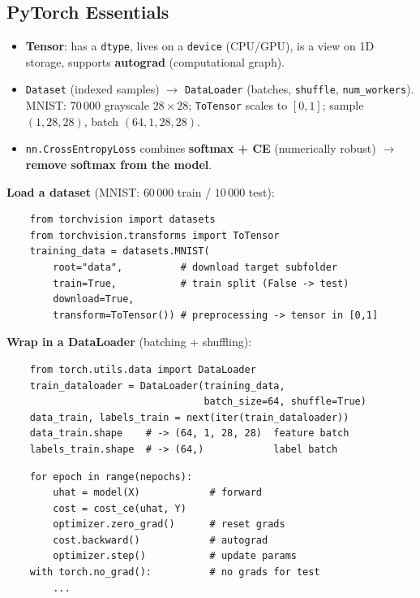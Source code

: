 \documentclass[10pt,a4paper]{article}
\begin{document}
	\subsection{PyTorch Essentials}

	\begin{itemize}[leftmargin=*]
		\item \textbf{Tensor}: has a \texttt{dtype}, lives on a \texttt{device} (CPU/GPU), is a view on 1D storage, supports \textbf{autograd} (computational graph).
		\item \texttt{Dataset} (indexed samples) $\rightarrow$ \texttt{DataLoader} (batches, \texttt{shuffle}, \texttt{num\_workers}). MNIST: $70\,000$ grayscale $28{\times}28$; \texttt{ToTensor} scales to $[0,1]$; sample $(1,28,28)$, batch $(64,1,28,28)$.
		\item \texttt{nn.CrossEntropyLoss} combines \textbf{softmax + CE} (numerically robust) $\rightarrow$ \textbf{remove softmax from the model}.
	\end{itemize}

	\textbf{Load a dataset} (MNIST: $60\,000$ train / $10\,000$ test):
	\begin{verbatim}
    from torchvision import datasets
    from torchvision.transforms import ToTensor
    training_data = datasets.MNIST(
        root="data",          # download target subfolder
        train=True,           # train split (False -> test)
        download=True,
        transform=ToTensor()) # preprocessing -> tensor in [0,1]
\end{verbatim}

	\textbf{Wrap in a DataLoader} (batching + shuffling):
	\begin{verbatim}
    from torch.utils.data import DataLoader
    train_dataloader = DataLoader(training_data,
                                  batch_size=64, shuffle=True)
    data_train, labels_train = next(iter(train_dataloader))
    data_train.shape    # -> (64, 1, 28, 28)  feature batch
    labels_train.shape  # -> (64,)            label batch
\end{verbatim}

	\begin{verbatim}
    for epoch in range(nepochs):
        uhat = model(X)            # forward
        cost = cost_ce(uhat, Y)
        optimizer.zero_grad()      # reset grads
        cost.backward()            # autograd
        optimizer.step()           # update params
    with torch.no_grad():          # no grads for test
        ...
\end{verbatim}
\end{document}
